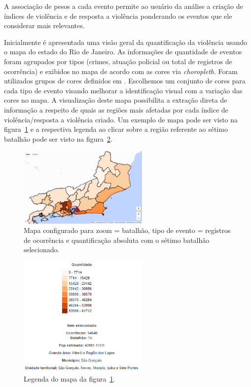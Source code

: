 \documentclass[10pt,conference]{IEEEtran}
\begin{document}
A associação de pesos a cada evento permite ao usuário da análise a criação de índices de violência e de resposta a violência  ponderando os eventos que ele considerar mais relevantes.

Inicialmente é apresentada uma visão geral da quantificação da violência usando o mapa do estado do Rio de Janeiro. As informações de quantidade de eventos foram agrupados por tipos (crimes, atuação policial ou total de registros de ocorrência) e  exibidos no mapa de acordo com as cores via \textit{choropleth}. Foram utilizados grupos de cores definidos em \cite{CynthiaBrewer2013}. Escolhemos um conjunto de cores para cada tipo de evento visando melhorar a identificação visual com a variação das cores no mapa. A visualização deste mapa possibilita a extração direta de informação a respeito de quais as regiões mais afetadas por cada índice de violência/resposta a violência criado. Um exemplo de mapa pode ser visto na figura~\ref{fig_mapaBPM} e a respectiva legenda ao clicar sobre a região referente ao sétimo batalhão pode ser visto na figura~\ref{fig_mapaBPM_legenda}.

\begin{figure}[!t]
\centering
\includegraphics[width=2.5in]{mapa_zoom_batalhao_evento_registros_ocorrencia_bpm_7_municipio_sao_goncalo.png}
\caption{Mapa configurado para zoom = batalhão, tipo de evento = registros de ocorrência e quantificação absoluta com o sétimo batalhão selecionado.}
\label{fig_mapaBPM}
\end{figure}

\begin{figure}[!t]
\centering
\includegraphics[width=2.5in]{legenda_mapa_zoom_batalhao_evento_registros_ocorrencia_bpm_7_municipio_sao_goncalo.png}
\caption{Legenda do mapa da figura~\ref{fig_mapaBPM}.}
\label{fig_mapaBPM_legenda}
\end{figure}
\end{document}
